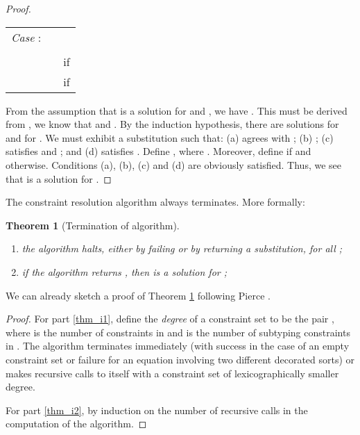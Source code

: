 \documentclass{eptcs}
\newcommand{\ih}{induction hypothesis\xspace}
\newtheorem{thm}{Theorem}[section]
\begin{document}
\begin{proof}
\begin{flushleft}
\begin{tabular}{lll}
        \textit{Case} :       & 
                                &                   \\
                                
                                &                         
                                &                                         \\
                                
                                & 
                                &  if          \\
                                & &  if      \\ 
\end{tabular}
\end{flushleft}

From the assumption that  is a solution for  and , we have
. This must be
derived from , we know that  and
. By the \ih, there are solutions
 for  and
 for . We must exhibit a substitution  such that: (a)  agrees with ; (b) ; (c) 
satisfies  and ; and (d)  satisfies . Define , where . Moreover, define  if  and  otherwise. Conditions (a), (b), (c) and (d) are obviously satisfied. Thus, we
see that  is a solution for .
\end{proof}

The constraint resolution algorithm always terminates. More formally:
\begin{thm}[Termination of algorithm] ~
\label{thm:termination}
\begin{enumerate}
\item \label{thm_i1} the algorithm halts, either by failing or by returning a
substitution, for all ;
\item \label{thm_i2}if the algorithm returns , then  is a solution for
;
\end{enumerate} 
\end{thm}

We can already sketch a proof of Theorem \ref{thm:termination} following Pierce
\cite{pierce:02}.
\begin{proof}
For part \ref{thm_i1}, define the {\em degree} of a constraint set  to be
the pair , where  is the number of constraints in  and  is the number
of subtyping constraints in . The algorithm terminates immediately (with
success in the case of an empty constraint set or failure for an equation involving two
different decorated sorts) or makes recursive calls to itself with
a constraint set of lexicographically smaller degree.

For part \ref{thm_i2}, by induction on the number of recursive calls in the
computation of the algorithm.
\end{proof}
\end{document}
